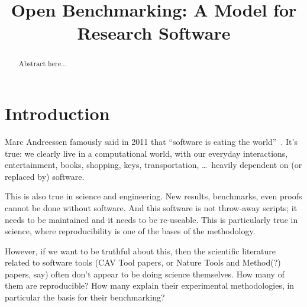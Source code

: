 \documentclass[conference]{IEEEtran}
\begin{document}

\title{Open Benchmarking: A Model for Research Software}

\author{
\and
{}
\and
{}
 }

\maketitle

\begin{abstract}
Abstract here...
\end{abstract}

\IEEEpeerreviewmaketitle

\section{Introduction}

Marc Andreessen famously said in 2011 that ``software is eating
the world''~\cite{andreessen:2011}. It's true: we clearly live in a
computational world, with our everyday interactions, entertainment, books, 
shopping, keys, transportation, \dots\ heavily dependent on (or replaced by)
software.

This is also true in science and engineering. New results, benchmarks, even proofs
cannot be done without software. And this software is not throw-away
scripts; it needs to be maintained and it needs to be re-useable. This
is particularly true in science, where reproducibility is one of the
bases of the methodology.

However, if we want to be truthful about this, then the scientific
literature related to software tools (CAV Tool papers, or Nature Tools
and Method(?)  papers, say) often don't appear to be doing science
themselves. How many of them are reproducible? How many explain their
experimental methodologies, in particular the basis for their
benchmarking?
\end{document}
